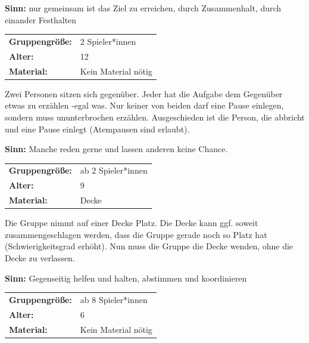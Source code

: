 \textbf{Sinn:} nur gemeinsam ist das Ziel zu erreichen, durch Zusammenhalt, durch einander Festhalten

\begin{table}[H]
\begin{tabular}{>{\bfseries}lp{8cm}}
   Gruppengröße:   & 2 Spieler*innen\\
    Alter: & 12 \\
    Material: & Kein Material nötig \\ 
\end{tabular}
\end{table} 


Zwei Personen sitzen sich gegenüber. Jeder hat die Aufgabe dem Gegenüber etwas zu erzählen -egal was. Nur keiner von beiden darf eine Pause einlegen, sondern muss ununterbrochen erzählen. Ausgeschieden ist die Person, die abbricht und eine Pause einlegt (Atempausen sind erlaubt).

\textbf{Sinn:} Manche reden gerne und lassen anderen keine Chance.

\begin{table}[H]
\begin{tabular}{>{\bfseries}lp{8cm}}
  Gruppengröße:   & ab 2 Spieler*innen\\
    Alter: & 9 \\
    Material: &  Decke\\ 
\end{tabular}
\end{table} 
Die Gruppe nimmt auf einer Decke Platz. Die Decke kann ggf. soweit zusammengeschlagen werden, dass die Gruppe gerade noch so Platz hat (Schwierigkeitsgrad erhöht). Nun muss die Gruppe die Decke wenden, ohne die Decke zu verlassen.

\textbf{Sinn:} Gegenseitig helfen und halten, abstimmen und koordinieren

\begin{table}[H]
\begin{tabular}{>{\bfseries}lp{8cm}}
   Gruppengröße:   & ab 8 Spieler*innen\\
    Alter: & 6 \\
    Material: & Kein Material nötig \\ 
\end{tabular}
\end{table} 


